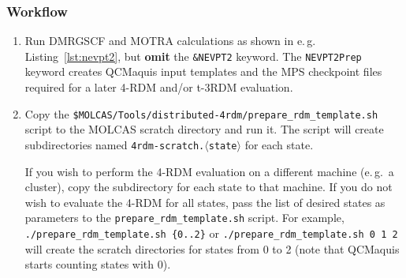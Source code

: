 \documentclass[bibliography=totoc,12pt,a4paper]{scrartcl}
\newcommand{\myemph}[1]{\textbf{#1}}
\newcommand{\kwd}[1]{\texttt{#1}}
\begin{document}
\subsubsection{Workflow}\label{sec:4rdm-workflow}
\begin{enumerate}
 \item Run DMRGSCF and MOTRA calculations as shown in e.\,g. Listing~\ref{lst:nevpt2}, but \myemph{omit} the \kwd{\&NEVPT2} keyword. The \kwd{NEVPT2Prep} keyword creates QCMaquis input templates and the MPS checkpoint files required for a later 4-RDM and/or t-3RDM evaluation.
 \item Copy the \kwd{\$MOLCAS/Tools/distributed-4rdm/prepare\_rdm\_template.sh} script to the MOLCAS scratch directory and run it. The script will create subdirectories named \kwd{4rdm-scratch.$\langle$state$\rangle$} for each state.

 If you wish to perform the 4-RDM evaluation on a different machine (e.\,g.\ a cluster), copy the subdirectory for each state to that machine.
 If you do not wish to evaluate the 4-RDM for all states, pass the list of desired states as parameters to the \kwd{prepare\_rdm\_template.sh} script. For example,
 \kwd{./prepare\_rdm\_template.sh \{0..2\}} or \kwd{./prepare\_rdm\_template.sh 0 1 2} will create the scratch directories for states from 0 to 2 (note that QCMaquis starts counting states with 0).


\end{enumerate}
\end{document}
